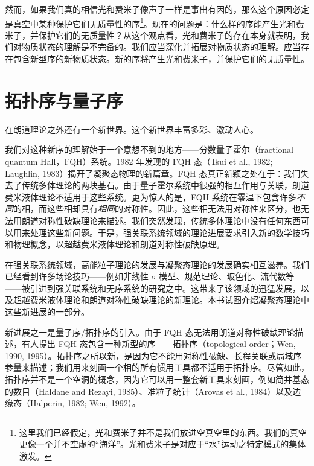 然而，如果我们真的相信光和费米子像声子一样是事出有因的，那么这个原因必定是真空中某种保护它们无质量性的序\footnote{这里我们已经假定，光和费米子并不是我们放进空真空里的东西。我们的真空更像一个并不空虚的“海洋”。光和费米子是对应于“水”运动之特定模式的集体激发。}。现在的问题是：什么样的序能产生光和费米子，并保护它们的无质量性？从这个观点看，光和费米子的存在本身就表明，我们对物质状态的理解是不完备的。我们应当深化并拓展对物质状态的理解。应当存在包含新型序的新物质状态。新的序将产生光和费米子，并保护它们的无质量性。

\section{拓扑序与量子序}

\begin{keypoints}
\item 在朗道理论之外还有一个新世界。这个新世界丰富多彩、激动人心。
\end{keypoints}

我们对这种新序的理解始于一个意想不到的地方——分数量子霍尔（fractional quantum Hall，FQH）系统。1982 年发现的 FQH 态（Tsui et al., 1982; Laughlin, 1983）揭开了凝聚态物理的新篇章。FQH 态真正新颖之处在于：我们失去了传统多体理论的两块基石。由于量子霍尔系统中很强的相互作用与关联，朗道费米液体理论不适用于这些系统。更为惊人的是，FQH 系统在零温下包含许多\emph{不同}的相，而这些相却具有\emph{相同}的对称性。因此，这些相无法用对称性来区分，也无法用朗道对称性破缺理论来描述。我们突然发现，传统多体理论中没有任何东西可以用来处理这些新问题。于是，强关联系统领域的理论进展要求引入新的数学技巧和物理概念，以超越费米液体理论和朗道对称性破缺原理。

在强关联系统领域，高能粒子理论的发展与凝聚态理论的发展确实相互滋养。我们已经看到许多场论技巧——例如非线性 $\sigma$ 模型、规范理论、玻色化、流代数等——被引进到强关联系统和无序系统的研究之中。这带来了该领域的迅猛发展，以及超越费米液体理论和朗道对称性破缺理论的新理论。本书试图介绍凝聚态理论中这些新进展的一部分。

新进展之一是量子序/拓扑序的引入。由于 FQH 态无法用朗道对称性破缺理论描述，有人提出 FQH 态包含一种新型的序——拓扑序（topological order；Wen, 1990, 1995）。拓扑序之所以新，是因为它不能用对称性破缺、长程关联或局域序参量来描述；我们用来刻画一个相的所有惯用工具都不适用于拓扑序。尽管如此，拓扑序并不是一个空洞的概念，因为它可以用一整套新工具来刻画，例如简并基态的数目（Haldane and Rezayi, 1985）、准粒子统计（Arovas et al., 1984）以及边缘态（Halperin, 1982; Wen, 1992）。


